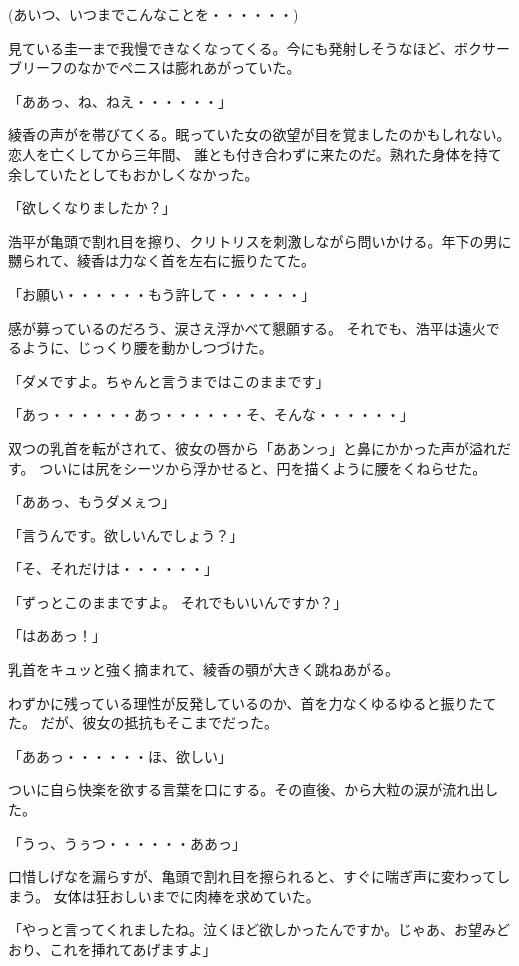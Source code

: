 ﻿\documentclass[book,tate]{jlreq}
\begin{document}
(あいつ、いつまでこんなことを・・・・・・)

見ている圭一まで我慢できなくなってくる。今にも発射しそうなほど、ボクサーブリーフのなかでペニスは膨れあがっていた。

「ああっ、ね、ねえ・・・・・・」

綾香の声がを帯びてくる。眠っていた女の欲望が目を覚ましたのかもしれない。恋人を亡くしてから三年間、
誰とも付き合わずに来たのだ。熟れた身体を持て余していたとしてもおかしくなかった。

「欲しくなりましたか？」

浩平が亀頭で割れ目を擦り、クリトリスを刺激しながら問いかける。年下の男に嬲られて、綾香は力なく首を左右に振りたてた。

「お願い・・・・・・もう許して・・・・・・」

感が募っているのだろう、涙さえ浮かべて懇願する。
それでも、浩平は遠火でるように、じっくり腰を動かしつづけた。

「ダメですよ。ちゃんと言うまではこのままです」

「あっ・・・・・・あっ・・・・・・そ、そんな・・・・・・」

双つの乳首を転がされて、彼女の唇から「ああンっ」と鼻にかかった声が溢れだす。
ついには尻をシーツから浮かせると、円を描くように腰をくねらせた。

「ああっ、もうダメぇつ」

「言うんです。欲しいんでしょう？」

「そ、それだけは・・・・・・」

「ずっとこのままですよ。 それでもいいんですか？」

「はああっ！」

乳首をキュッと強く摘まれて、綾香の顎が大きく跳ねあがる。

わずかに残っている理性が反発しているのか、首を力なくゆるゆると振りたてた。
だが、彼女の抵抗もそこまでだった。

「ああっ・・・・・・ほ、欲しい」

ついに自ら快楽を欲する言葉を口にする。その直後、から大粒の涙が流れ出した。

「うっ、うぅつ・・・・・・ああっ」

口惜しげなを漏らすが、亀頭で割れ目を擦られると、すぐに喘ぎ声に変わってしまう。
女体は狂おしいまでに肉棒を求めていた。

「やっと言ってくれましたね。泣くほど欲しかったんですか。じゃあ、お望みどおり、これを挿れてあげますよ」
\end{document}
